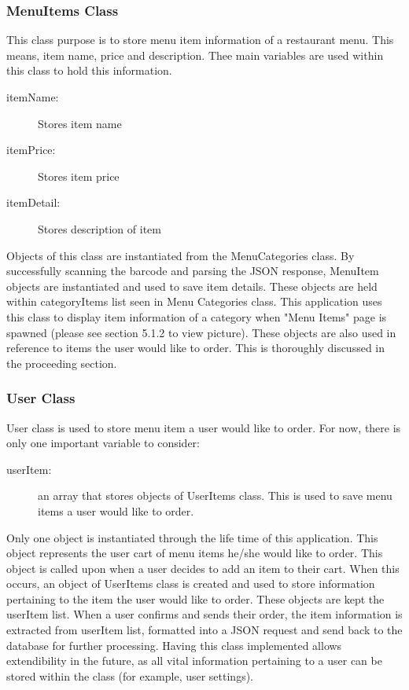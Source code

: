 \documentclass[12pt, titlepage]{article}
\begin{document}
\subsubsection{MenuItems Class}
This class purpose is to store menu item information of a restaurant menu. This means, item name, price and description. Thee main variables are used within this class to hold this information.

\begin{description}
  \item[itemName:] Stores item name
  \item[itemPrice:] Stores item price
  \item[itemDetail:] Stores description of item
\end{description}

Objects of this class are instantiated from the MenuCategories class. By successfully scanning the barcode and parsing the JSON response, MenuItem objects are instantiated and used to save item details. These objects are held within categoryItems list seen in Menu Categories class. This application uses this class to display item information of a category when "Menu Items" page is spawned (please see section 5.1.2 to view picture). These objects are also used in reference to items the user would like to order. This is thoroughly discussed in the proceeding section.  

\subsubsection{User Class}
User class is used to store menu item a user would like to order. For now, there is only one important variable to consider: 

 \begin{description}
  \item[userItem:] an array that stores objects of UserItems class. This is used to save menu items a user would like to order.
\end{description}

Only one object is instantiated through the life time of this application. This object represents the user cart of menu items he/she would like to order. This object is called upon when a user decides to add an item to their cart. When this occurs, an object of UserItems class is created and used to store information pertaining to the item the user would like to order. These objects are kept the userItem list. When a user confirms and sends their order, the item information is extracted from userItem list, formatted into a JSON request and send back to the database for further processing. Having this class implemented allows extendibility in the future, as all vital information pertaining to a user can be stored within the class (for example, user settings). 
\end{document}
